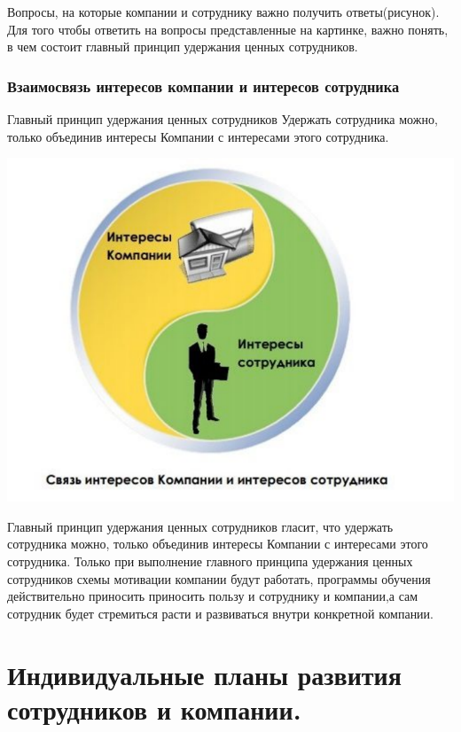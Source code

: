 \documentclass{../industrial-development}
\begin{document}
\lecturenotes
Вопросы, на которые компании и сотруднику важно получить ответы(рисунок).
Для того чтобы ответить на вопросы представленные на картинке, важно понять, в чем состоит главный принцип удержания ценных сотрудников.


\begin{frame} \frametitle{Взаимосвязь интересов компании и интересов сотрудника}
  \begin{block}{Главный принцип удержания ценных сотрудников}
Удержать сотрудника можно, только объединив интересы Компании с интересами этого сотрудника.
  \end{block}
  \centerline{\includegraphics[height=0.58\textheight]{11-IT-specialist's-way/inter.pdf}}
\end{frame}

\lecturenotes
Главный принцип удержания ценных сотрудников гласит, что удержать сотрудника можно, только объединив интересы Компании с интересами этого сотрудника.
Только при выполнение главного принципа удержания ценных сотрудников схемы мотивации компании будут работать, программы обучения действительно приносить приносить пользу и сотруднику и компании,а сам сотрудник будет стремиться расти и развиваться внутри конкретной компании.



\section{Индивидуальные планы развития сотрудников и компании. }
\end{document}
